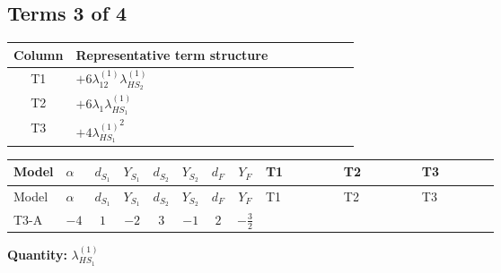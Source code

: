 \documentclass[8pt]{article}
\begin{document}
\begin{landscape}
\subsection*{Terms 3 of 4}
\begin{center}
\begin{tabular}{@{}c >{\raggedright\arraybackslash}p{0.82\linewidth}@{}}
\toprule
Column & Representative term structure \\
\midrule
T1 & \(\displaystyle +6 {\lambda_{12}^{(1)}} {\lambda_{HS_2}^{(1)}}\) \\
\midrule
T2 & \(\displaystyle +6 {\lambda_1} {\lambda_{HS_1}^{(1)}}\) \\
\midrule
T3 & \(\displaystyle +4 {\lambda_{HS_1}^{(1)}}^2\) \\
\midrule
\bottomrule
\end{tabular}
\end{center}
\smallskip
\tiny
\begin{longtable}{@{}llcccccc >{\raggedright\arraybackslash}p{0.21\linewidth} >{\raggedright\arraybackslash}p{0.21\linewidth} >{\raggedright\arraybackslash}p{0.21\linewidth}@{}}
\toprule
Model & $\alpha$ & $d_{S_1}$ & $Y_{S_1}$ & $d_{S_2}$ & $Y_{S_2}$ & $d_F$ & $Y_F$ & T1 & T2 & T3 \\
\midrule
\endfirsthead
\toprule
Model & $\alpha$ & $d_{S_1}$ & $Y_{S_1}$ & $d_{S_2}$ & $Y_{S_2}$ & $d_F$ & $Y_F$ & T1 & T2 & T3 \\
\midrule
\endhead
T3-A & $-4$ & $1$ & $-2$ & $3$ & $-1$ & $2$ & $-\frac{3}{2}$ & \scriptsize\adjustbox{max width=\linewidth}{$\begin{gathered} +6 {\lambda_{12}^{(1)}} {\lambda_{HS_2}^{(1)}}\end{gathered}$} & \scriptsize\adjustbox{max width=\linewidth}{$\begin{gathered} +6 {\lambda_1} {\lambda_{HS_1}^{(1)}}\end{gathered}$} & \scriptsize\adjustbox{max width=\linewidth}{$\begin{gathered} +4 {\lambda_{HS_1}^{(1)}}^2\end{gathered}$} \\
\midrule
\bottomrule
\end{longtable}
\clearpage
\noindent\textbf{Quantity: }$\lambda_{HS_1}^{(1)}$\par\smallskip

\end{landscape}
\end{document}

